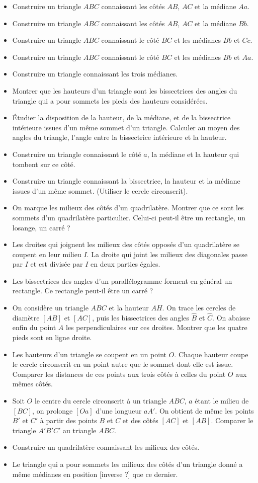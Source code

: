 \documentclass[12 pt]{report}
\theoremstyle{plain}
\newcounter{n}
\renewcommand{\it}{\item[$\mathbf{\then}.$]\stepcounter{n} }
\begin{document}
 \begin{itemize}
 \it Construire un triangle $ABC$ connaissant les côtés $AB$, $AC$ et la médiane $Aa$. 
 \it Construire un triangle $ABC$ connaissant les côtés $AB$, $AC$ et la médiane $Bb$.
 \it Construire un triangle $ABC$ connaissant le côté $BC$ et les médianes $Bb$ et $Cc$. 
 \it Construire un triangle $ABC$ connaissant le côté $BC$ et les médianes $Bb$ et $Aa$. 
 \it Construire un triangle connaissant les trois médianes. 
 \it Montrer que les hauteurs d'un triangle sont les bissectrices des 
 angles du triangle qui a pour sommets les pieds des hauteurs considérées. 
 \it Étudier la disposition de la hauteur, de la médiane, et de la bissectrice intérieure issues d'un même sommet d'un triangle. 
 Calculer au moyen des angles du triangle, l'angle entre la bissectrice intérieure et la hauteur. 
 \it Construire un triangle connaissant le côté $a$, la médiane et la hauteur qui tombent sur ce côté. 
 \it Construire un triangle connaissant la bissectrice, la hauteur et
 la médiane issues d'un même sommet. (Utiliser le cercle circonscrit). 
 \it On marque les milieux des côtés d'un quadrilatère. Montrer que ce sont les sommets d'un quadrilatère particulier. Celui-ci peut-il être un rectangle, un losange, un carré ? 
 \it Les droites qui joignent les milieux des côtés opposés d'un quadrilatère se coupent en leur milieu $I$. La droite qui joint les milieux des diagonales passe par $I$ et est divisée par $I$ en deux parties égales. 
 \it Les bissectrices des angles d'un parallélogramme forment en général un rectangle. Ce rectangle peut-il être un carré ? 
 \it On considère un triangle $ABC$ et la hauteur $AH$. On trace les cercles de diamètre $[AB]$ et $[AC]$, puis les bissectrices des angles 
 $\widehat B$ et $\widehat{C}$. On abaisse enfin du point $A$ les perpendiculaires sur ces droites. Montrer que les quatre pieds sont en ligne droite. 
 \it  Les hauteurs d'un triangle se coupent en un point $O$. Chaque hauteur coupe le cercle circonscrit en un point autre que le sommet dont elle est issue. Comparer les distances de ces points aux trois côtés à celles du point $O$ aux mêmes côtés. 
 \it Soit $O$ le centre du cercle circonscrit à un triangle $ABC$, $a$ étant le milieu de $[BC]$, on prolonge $[Oa]$ d'une longueur $aA'$. On obtient de même les points $B'$ et $C'$ à partir des points $B$ et $C$ et des côtés $[AC]$ et $[AB]$. Comparer le triangle $A'B'C'$ au triangle $ABC$. 
 \it Construire un quadrilatère connaissant les milieux des côtés. 
 \it Le triangle qui a pour sommets les milieux des côtés d'un triangle donné a même médianes en position [inverse ?] que ce dernier. 

\end{itemize}
\end{document}
